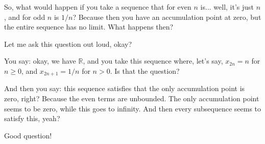 \begin{student}
So, what would happen if you take a sequence that for even $n$ is... well, it's just $n$, and for odd $n$ is $1/n$? Because then you have an accumulation point at zero, but the entire sequence has no limit. What happens then?
\end{student}

\begin{speech}[00:39:30 - 00:40:45]
Let me ask this question out loud, okay?

 You say: okay, we have $\mathbb{R}$, and you take this sequence where, let's say, $x_{2n} = n$ for $n \ge 0$, and $x_{2n+1} = 1/n$ for $n > 0$. Is that the question?

And then you say: this sequence satisfies that the only accumulation point is zero, right? Because the even terms are unbounded.  The only accumulation point seems to be zero, while this goes to infinity. And then every subsequence seems to satisfy this, yeah?

Good question!
\end{speech}

